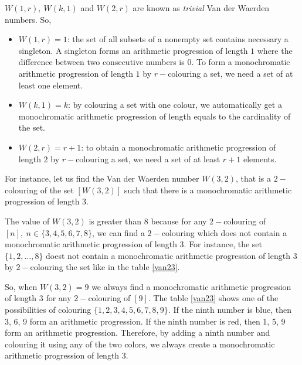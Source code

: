 
$W(1,r), \ W(k,1)$ and $W(2,r)$ are known as \textit{trivial} Van der Waerden numbers. So, 
\begin{itemize}
\item $W(1,r)=1$:  the set of all subsets of a nonempty set contains necessary a singleton. A singleton forms an arithmetic progression of length $1$ where the difference between two consecutive numbers is $0.$ To form a monochromatic arithmetic progression of length $1$ by $r-$colouring a set, we need  a set of at least one element. 
\item $W(k,1)=k$: by colouring a set with one colour, we automatically get a monochromatic arithmetic progression of length equals to the cardinality  of the set.
\item $W(2,r)=r+1$: to obtain a monochromatic arithmetic progression of length $2$ by $r-$colouring a set, we need a set of at least $r+1$ elements.
\end{itemize}

 

For instance, let us find the Van der Waerden number $W(3,2)$, that is a $2-$colouring  of the set $[W(3,2)]$ such that there is a monochromatic arithmetic progression of length $3.$

The value of $W(3,2)$ is greater than $8$ because for any $2-$colouring of $[n],\ n\in \{3,4,5,6,7,8\}$, we can find a $2-$colouring which does not contain a monochromatic arithmetic progression of length 3. For instance, the set  $\{1,2,\ldots, 8\}$ doest not contain a monochromatic  arithmetic progression of length $3$ by $2-$colouring the set  like in the table \eqref{van23}.

So, when $W(3,2)=9$ we always find a monochromatic arithmetic progression of length 3 for any $2-$colouring of $[9].$ The table \eqref{van23} shows one of the possibilities of colouring $\{1,2,3,4,5,6,7,8,9\}.$  If the ninth number is {\color{blue} blue}, then{ \color{blue}3, 6, 9}  form an arithmetic progression. If the ninth number is {\color{red} red}, then {\color{red}1, 5, 9} form an arithmetic progression. Therefore, by adding a ninth number and colouring it using any of the two colors, we always create  a monochromatic arithmetic progression of length 3.


